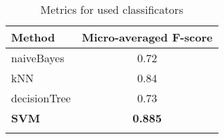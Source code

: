 \begin{table}[h!]
    \caption{Metrics for used classificators}
    \begin{center}
        \begin{tabular}{lc}
            \toprule
            \textbf{Method} & \textbf{Micro-averaged F-score} \\
            \midrule
            naiveBayes & 0.72 \\
            kNN & 0.84 \\
            decisionTree & 0.73 \\
            \textbf{SVM} & \textbf{0.885} \\
            \bottomrule
            \label{table:metrics_all}
        \end{tabular}
    \end{center}
\end{table}
